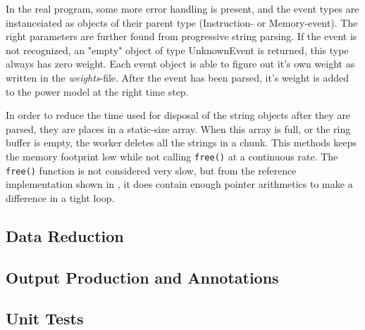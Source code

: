 In the real program, some more error handling is present, and the event types
are instanceiated as objects of their parent type (Instruction- or
Memory-event). The right parameters are further found from progressive string
parsing. If the event is not recognized, an "empty" object of type UnknownEvent
is returned, this type always has zero weight. Each event object is able to
figure out it's own weight as written in the \emph{weights}-file. After the
event has been parsed, it's weight is added to the power model at the right
time step.

In order to reduce the time used for disposal of the string objects
after they are parsed, they are places in a static-size array. When
this array is full, or the ring buffer is empty, the worker deletes
all the strings in a chunk. This methods keeps the memory footprint
low while not calling \texttt{free()} at a continuous rate. The \texttt{free()}
function is not considered very slow, but from the reference implementation
shown in \cite{kernighan1988c}, it does contain enough pointer
arithmetics to make a difference in a tight loop.

\subsection{Data Reduction}



\subsection{Output Production and Annotations}

\subsection{Unit Tests}



